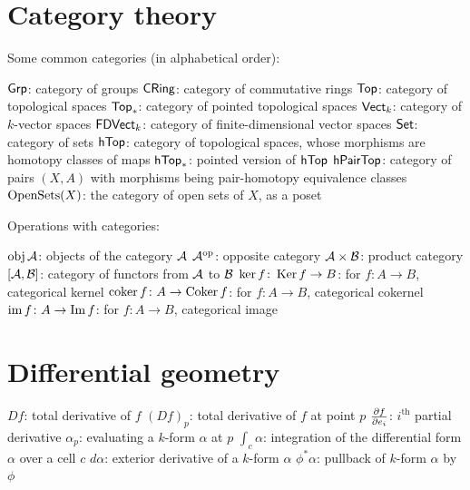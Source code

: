 \section{Category theory}
Some common categories (in alphabetical order):
\begin{itemize}
	\ii $\catname{Grp}$: category of groups
	\ii $\catname{CRing}$: category of commutative rings
	\ii $\catname{Top}$: category of topological spaces
	\ii $\catname{Top}_\ast$: category of pointed topological spaces
	\ii $\catname{Vect}_k$: category of $k$-vector spaces
	\ii $\catname{FDVect}_k$: category of finite-dimensional vector spaces
	\ii $\catname{Set}$: category of sets
	\ii $\catname{hTop}$: category of topological spaces,
	whose morphisms are homotopy classes of maps
	\ii $\catname{hTop}_\ast$: pointed version of $\catname{hTop}$
	\ii $\catname{hPairTop}$: category of pairs $(X,A)$ with morphisms
	being pair-homotopy equivalence classes
	\ii $\Opens(X)$: the category of open sets of $X$, as a poset
\end{itemize}
Operations with categories:
\begin{itemize}
	\ii $\obj \AA$: objects of the category $\AA$
	\ii $\AA\op$: opposite category
	\ii $\AA \times \BB$: product category
	\ii $[\AA, \BB]$: category of functors from $\AA$ to $\BB$
	\ii $\ker f \colon \Ker f \to B$: for $f \colon A \to B$, categorical kernel
	\ii $\coker f \colon A \to \Coker f$: for $f \colon A \to B$, categorical cokernel
	\ii $\img f \colon A \to \Img f$: for $f \colon A \to B$, categorical image
\end{itemize}

\section{Differential geometry}
\begin{itemize}
	\ii $Df$: total derivative of $f$
	\ii $(Df)_p$: total derivative of $f$ at point $p$
	\ii $\fpartial{f}{e_i}$: $i^{\text{th}}$ partial derivative
	\ii $\alpha_p$: evaluating a $k$-form $\alpha$ at $p$
	\ii $\int_c \alpha$: integration of the differential form $\alpha$ over a cell $c$
	\ii $d\alpha$: exterior derivative of a $k$-form $\alpha$
	\ii $\phi^\ast \alpha$: pullback of $k$-form $\alpha$ by $\phi$
\end{itemize}


